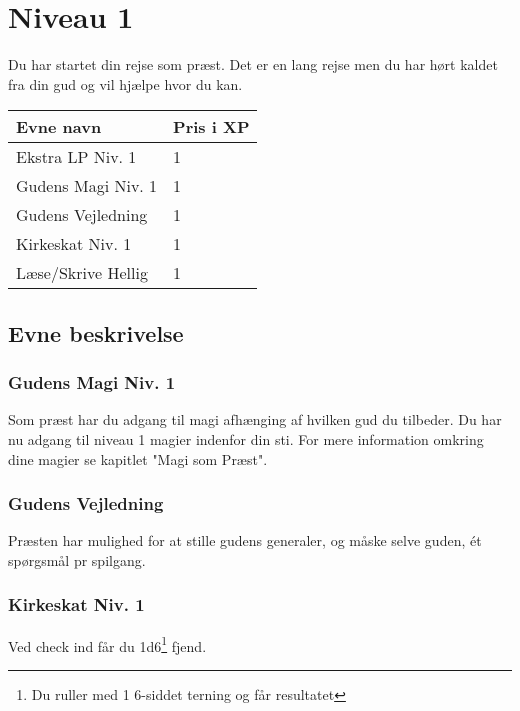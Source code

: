 \chapter*{Niveau 1}
Du har startet din rejse som præst. Det er en lang rejse men du har hørt kaldet fra din gud og vil hjælpe hvor du kan.

\begin{table}[H]
    \centering
    \begin{tabular}{|p{}|p{}|}
    \rowcolor{cerulean!80}\hline
        Evne navn & Pris i XP \\\hline
            Ekstra LP Niv. 1 & 1 \\\hline
            Gudens Magi Niv. 1 & 1 \\\hline
            Gudens Vejledning & 1 \\\hline
            Kirkeskat Niv. 1 & 1 \\\hline
            Læse/Skrive Hellig & 1 \\\hline
    \end{tabular}
\end{table}

\section*{Evne beskrivelse}



\subsection*{Gudens Magi Niv. 1}
Som præst har du adgang til magi afhænging af hvilken gud du tilbeder. Du har nu adgang til niveau 1 magier indenfor din sti. For mere information omkring dine magier se kapitlet "Magi som Præst".

\subsection*{Gudens Vejledning}
Præsten har mulighed for at stille gudens generaler, og måske selve guden, ét spørgsmål pr spilgang.

\subsection*{Kirkeskat Niv. 1}
Ved check ind får du 1d6\footnote{Du ruller med 1 6-siddet terning og får resultatet} fjend.


